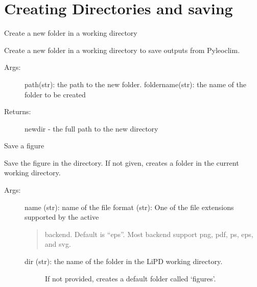 \documentclass[letterpaper,10pt,english]{sphinxmanual}
\begin{document}
\section{Creating Directories and saving}
\label{\detokenize{LipdUtils:creating-directories-and-saving}}

\begin{fulllineitems}
\label{\detokenize{LipdUtils:pyleoclim.LipdUtils.createDir}}
Create a new folder in a working directory

Create a new folder in a working directory to save outputs from Pyleoclim.
\begin{description}
\item[{Args:}] \leavevmode
path(str): the path to the new folder.
foldername(str): the name of the folder to be created

\item[{Returns:}] \leavevmode
newdir - the full path to the new directory

\end{description}

\end{fulllineitems}


\begin{fulllineitems}
\label{\detokenize{LipdUtils:pyleoclim.LipdUtils.saveFigure}}
Save a figure

Save the figure in the directory. If not given, creates a folder in the 
current working directory.
\begin{description}
\item[{Args:}] \leavevmode
name (str): name of the file
format (str): One of the file extensions supported by the active
\begin{quote}

backend. Default is “eps”. Most backend support png, pdf, ps, eps,
and svg.
\end{quote}
\begin{description}
\item[{dir (str): the name of the folder in the LiPD working directory.}] \leavevmode
If not provided, creates a default folder called ‘figures’.

\end{description}

\end{description}

\end{fulllineitems}
\end{document}
